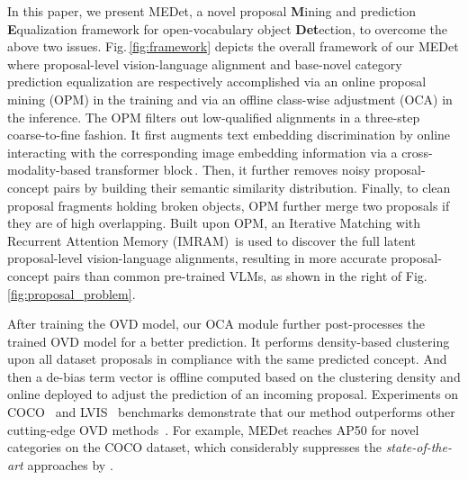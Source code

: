 \documentclass[10pt,twocolumn,letterpaper]{article}
\begin{document}
In this paper, we present MEDet, a novel proposal \textbf{M}ining and prediction \textbf{E}qualization framework for open-vocabulary object \textbf{Det}ection, to overcome the above two issues. Fig.\,\ref{fig:framework} depicts the overall framework of our MEDet where proposal-level vision-language alignment and base-novel category prediction equalization are respectively accomplished via an online proposal mining (OPM) in the training and via an offline class-wise adjustment (OCA) in the inference.
The OPM filters out low-qualified alignments in a three-step coarse-to-fine fashion. 
It first augments text embedding discrimination by online interacting with the corresponding image embedding information via a cross-modality-based transformer block\,\cite{ViT}. 
Then, it further removes noisy proposal-concept pairs by building their semantic similarity distribution.
Finally, to clean proposal fragments holding broken objects, OPM further merge two proposals if they are of high overlapping.
Built upon OPM, an Iterative Matching with Recurrent Attention Memory (IMRAM)\,\cite{imram}  is used to discover the full latent proposal-level vision-language alignments, resulting in more accurate proposal-concept pairs than common pre-trained VLMs, as shown in the right of Fig.\,\ref{fig:proposal_problem}.








After training the OVD model, our OCA module further post-processes the trained OVD model for a better prediction. It performs density-based clustering~\cite{rodriguez2014clustering} upon all dataset proposals in compliance with the same predicted concept. And then a de-bias term vector is offline computed based on the clustering density and online deployed to adjust the prediction of an incoming proposal.
Experiments on COCO~\cite{coco_zeroshot} and LVIS~\cite{lvis} benchmarks demonstrate that our method outperforms other cutting-edge OVD methods~\cite{ovrcnn,vild,detic,regionCLIP}.
For example, MEDet reaches  AP50 for novel categories on the COCO dataset, which considerably suppresses the \textit{state-of-the-art} approaches by . 
\end{document}
